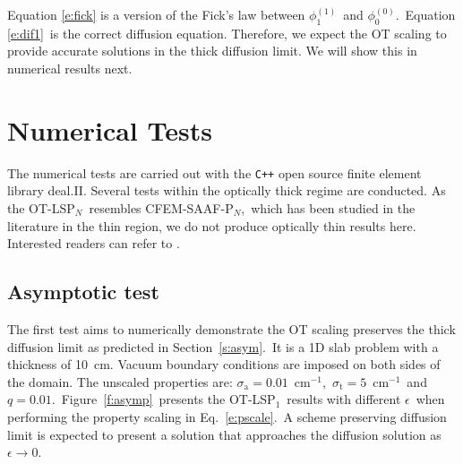 \documentclass[review]{elsarticle}
\newcommand{\st}{\sigma_\mathrm{t}}
\newcommand{\pn}{P$_N$}
\newcommand{\siga}{\sigma_\mathrm{a}}
\newcommand{\icm}{cm$^{-1}$}
\newcommand{\pp}[1]{P$_{#1}$}
\newcommand{\pord}[2]{\phi_{#1}^{(#2)}}
\begin{document}
Equation \eqref{e:fick} is a version of the Fick's law between $\pord{1}{1}$\ and $\pord{0}{0}$.\ 
Equation \eqref{e:dif1}\ is the  correct diffusion equation. Therefore, we expect the OT scaling to provide accurate solutions in the thick diffusion limit.  We will show this in numerical results next.

%
\section{Numerical Tests}
\label{s:num}
The numerical tests are carried out with the {\tt C{\small ++}} open source finite element library deal.II\cite{dealii82}. {Several tests within the optically thick regime are conducted. As the OT-LS\pn\ resembles CFEM-SAAF-\pn,\ which has been studied in the literature in the thin region, we do not produce optically thin results here. Interested readers can refer to \cite{clifmc,cao-saaf-pn,saaf-thesis}.}
\subsection{Asymptotic test}
The first test aims to numerically demonstrate the OT scaling preserves the thick diffusion limit as predicted in Section\ \ref{s:asym}.\ It is a 1D slab problem with a thickness of 10\ cm. Vacuum boundary conditions are imposed on both sides of the domain. The unscaled properties are: $\siga=0.01$\ \icm,\ $\st=5$\ \icm\ and $q=0.01$.\ Figure\ \ref{f:asymp}\ presents the OT-LS\pp{1}\ results with different $\epsilon$\ when performing the property scaling in Eq.\ \eqref{e:pscale}.\ A scheme preserving diffusion limit is expected to present a solution that approaches the diffusion solution as $\epsilon \rightarrow 0$.
\end{document}
